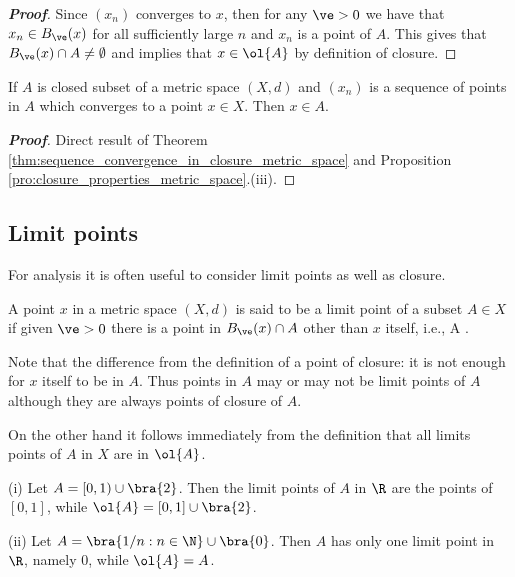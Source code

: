 \begin{proof}[\bf Proof]
Since $(x_n)$ converges to $x$, then for any $\ve>0$ we have that $x_n \in B_\ve(x)$ for all sufficiently large $n$ and $x_n$ is a point of $A$. This gives that $B_\ve(x)\cap A \neq \emptyset$ and implies that $x\in \ol{A}$ by definition of closure.
\end{proof}


\begin{corollary}
If $A$ is closed subset of a metric space $(X,d)$ and $(x_n)$ is a sequence of points in $A$ which converges to a point $x\in X$. Then $x\in A$.
\end{corollary}

\begin{proof}[\bf Proof]
Direct result of Theorem \ref{thm:sequence_convergence_in_closure_metric_space} and Proposition \ref{pro:closure_properties_metric_space}.(iii).
\end{proof}



\subsection{Limit points}

For analysis it is often useful to consider limit points as well as closure.

\begin{definition}\label{def:limit_point_metric_space}%
A point $x$ in a metric space $(X,d)$ is said to be a limit point of a subset $A\in X$ if given $\ve>0$ there is a point in $B_\ve(x)\cap A$ other than $x$ itself, i.e.,
\be
{}\cap A \neq \emptyset.
\ee
\end{definition}

\begin{remark}
Note that the difference from the definition of a point of closure: it is not enough for $x$ itself to be in $A$. Thus points in $A$ may or may not be limit points of $A$ although they are always points of closure of $A$.

On the other hand it follows immediately from the definition that all limits points of $A$ in $X$ are in $\ol{A}$.
\end{remark}

\begin{example}
\ben
\item [(i)] Let $A=[0,1)\cup \bra{2}$. Then the limit points of $A$ in $\R$ are the points of $[0,1]$, while $\ol{A} = [0,1]\cup\bra{2}$.

\item [(ii)] Let $A = \bra{1/n:n\in \N}\cup \bra{0}$. Then $A$ has only one limit point in $\R$, namely 0, while $\ol{A} = A$.
\een
\end{example}

